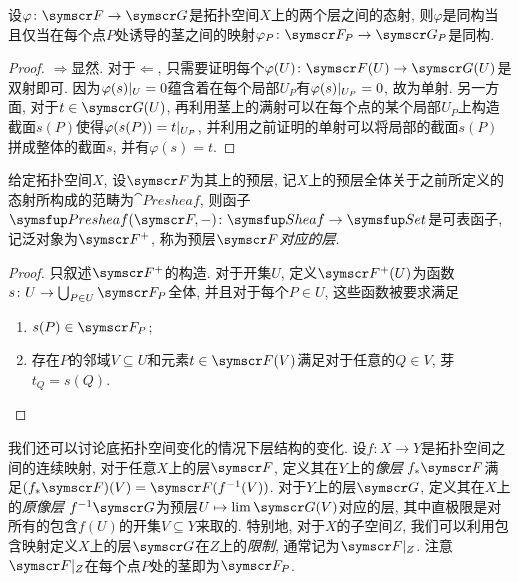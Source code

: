 \begin{proposition}
  设$\varphi\colon \sheaf{F}\to\sheaf{G}$是拓扑空间$X$上的两个层之间的态射, 则$\varphi$是同构当且仅当在每个点$P$处诱导的茎之间的映射$\varphi_P\colon \sheaf{F}_P\to\sheaf{G}_P$是同构.
\end{proposition}

\begin{proof}
  $\Rightarrow$显然. 对于$\Leftarrow$, 只需要证明每个$\varphi (U)\colon \sheaf{F}(U)\to\sheaf{G}(U)$是双射即可. 因为$\varphi(s)\vert_{U}=0$蕴含着在每个局部$U_P$有$\varphi(s)\vert_{U_P}=0$, 故为单射. 另一方面, 对于$t\in \sheaf{G}(U)$, 再利用茎上的满射可以在每个点的某个局部$U_P$上构造截面$s(P)$使得$\varphi(s(P))=t\vert_{U_P}$, 并利用之前证明的单射可以将局部的截面$s(P)$拼成整体的截面$s$, 并有$\varphi(s)=t$.
\end{proof}

\begin{proposition}
  给定拓扑空间$X$, 设$\sheaf{F}$为其上的预层, 记$X$上的预层全体关于之前所定义的态射所构成的范畴为$\cat{Presheaf}$, 则函子$\cat{Presheaf}(\sheaf{F}, -)\colon \cat{Sheaf}\to \cat{Set}$是可表函子, 记泛对象为$\sheaf{F}^+$, 称为预层$\sheaf{F}$\emph{对应的层}.
\end{proposition}

\begin{proof}
  只叙述$\sheaf{F}^+$的构造. 对于开集$U$, 定义$\sheaf{F}^+(U)$为函数$s\colon U\to \bigcup_{P\in U}\sheaf{F}_P$全体, 并且对于每个$P\in U$, 这些函数被要求满足
  \begin{enumerate}
    \item $s(P)\in\sheaf{F}_P$;
    \item 存在$P$的邻域$V\subseteq U$和元素$t\in \sheaf{F}(V)$满足对于任意的$Q\in V$, 芽$t_Q=s(Q)$.
  \end{enumerate}
\end{proof}

我们还可以讨论底拓扑空间变化的情况下层结构的变化. 设$f\colon X\to Y$是拓扑空间之间的连续映射, 对于任意$X$上的层$\sheaf{F}$, 定义其在$Y$上的\emph{像层} $f_*\sheaf{F}$满足$(f_*\sheaf{F})(V)=\sheaf{F}(f^{-1}(V))$. 对于$Y$上的层$\sheaf{G}$, 定义其在$X$上的\emph{原像层} $f^{-1}\sheaf{G}$为预层$U\mapsto\dlim \sheaf{G}(V)$对应的层, 其中直极限是对所有的包含$f(U)$的开集$V\subseteq Y$来取的. 特别地, 对于$X$的子空间$Z$, 我们可以利用包含映射定义$X$上的层$\sheaf{G}$在$Z$上的\emph{限制}, 通常记为$\sheaf{F}\restrict{Z}$. 注意$\sheaf{F}\restrict{Z}$在每个点$P$处的茎即为$\sheaf{F}_P$.

